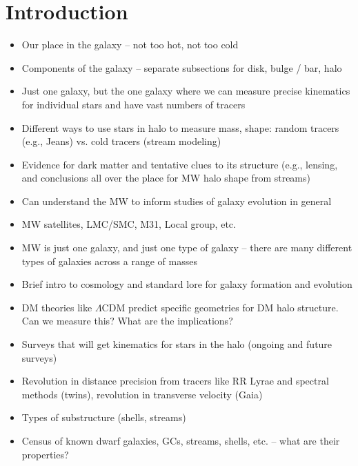 \chapter[Introduction]{Introduction}
\label{ch:intro}


\begin{itemize}
	\item Our place in the galaxy -- not too hot, not too cold
	\item Components of the galaxy -- separate subsections for disk, bulge / bar, halo
	\item Just one galaxy, but the one galaxy where we can measure precise kinematics for individual stars and have vast numbers of tracers
	\item Different ways to use stars in halo to measure mass, shape: random tracers (e.g., Jeans) vs. cold tracers (stream modeling)
	\item Evidence for dark matter and tentative clues to its structure (e.g., lensing, and conclusions all over the place for MW halo shape from streams)
	\item Can understand the MW to inform studies of galaxy evolution in general
\end{itemize}

\begin{itemize}
	\item MW satellites, LMC/SMC, M31, Local group, etc.
	\item MW is just one galaxy, and just one type of galaxy -- there are many different types of galaxies across a range of masses
	\item Brief intro to cosmology and standard lore for galaxy formation and evolution
	\item DM theories like $\Lambda$CDM predict specific geometries for DM halo structure. Can we measure this? What are the implications?
\end{itemize}

\begin{itemize}
	\item Surveys that will get kinematics for stars in the halo (ongoing and future surveys)
	\item Revolution in distance precision from tracers like RR Lyrae and spectral methods (twins), revolution in transverse velocity (Gaia)
	\item Types of substructure (shells, streams)
	\item Census of known dwarf galaxies, GCs, streams, shells, etc. -- what are their properties?
\end{itemize}

